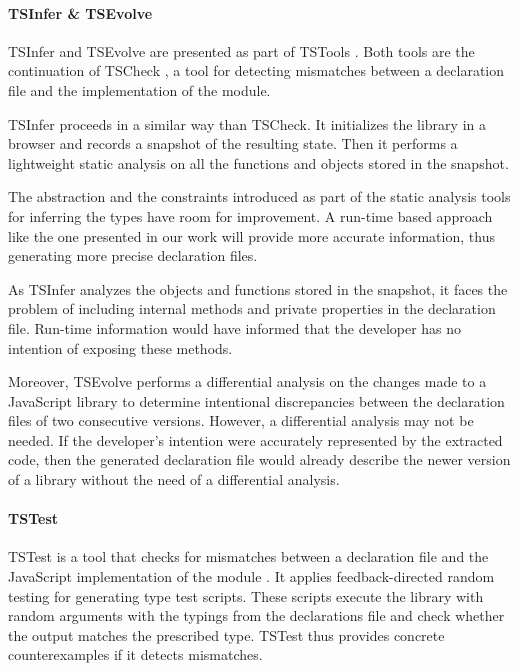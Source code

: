 \documentclass[english,cleveref,autoref,submission]{programming}
\begin{document}
\paragraph*{TSInfer \& TSEvolve}
TSInfer and TSEvolve are presented as part of TSTools
\cite{DBLP:conf/fase/KristensenM17}. Both tools are the continuation of TSCheck
\cite{DBLP:conf/oopsla/FeldthausM14}, a tool for detecting mismatches between a
declaration file and the implementation of the module. 

TSInfer proceeds in a similar way than TSCheck. It initializes the library in a browser
and records a snapshot of the resulting state.  Then it performs a lightweight static
analysis on all the functions and objects stored in the snapshot. 

The abstraction and the constraints introduced as part of the static analysis tools
for inferring the types have room for improvement. A run-time based approach like the one
presented in our work will provide more accurate information, thus generating more precise
declaration files.

As TSInfer analyzes the objects and functions stored in the snapshot, it faces the problem
of including internal methods and private properties in the declaration file. Run-time
information would have informed that the developer has no intention of exposing these
methods. 

Moreover, TSEvolve performs a differential analysis on the changes made to a JavaScript
library to determine intentional discrepancies between the declaration files of two
consecutive versions. However, a differential analysis may not be needed. If the
developer's intention were accurately represented by the extracted code, then the generated
declaration file would already describe the newer version of a library without the need of
a differential analysis.

\paragraph*{TSTest}
TSTest is a tool that checks for mismatches between a declaration file and the JavaScript
implementation of the module \cite{DBLP:journals/pacmpl/KristensenM17}. It applies feedback-directed
random testing for generating type test scripts. These scripts execute the library with
random arguments with the typings from the declarations file and check whether the output
matches the prescribed type. TSTest thus provides concrete counterexamples if it detects mismatches.
\end{document}
